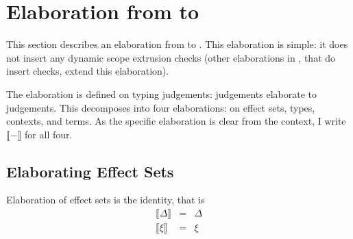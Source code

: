 \section{Elaboration from \texorpdfstring{\sourceLang{}}{Lambda-Op-Quote-Splice} to \texorpdfstring{\coreLang{}}{Lambda-Op-AST}}\label{section:elaboration}
This section describes an elaboration from \sourceLang{} to \coreLang{}. This elaboration is simple: it does not insert any dynamic scope extrusion checks (other elaborations in , that do insert checks, extend this elaboration).

\newcommand{\elaborate}[1]{\llbracket #1 \rrbracket}
\newcommand{\erase}[1]{\textsf{erase}(#1)}
\newcommand{\AST}[1]{\textsf{AST}(#1)}
\newcommand{\Code}[1]{\textsf{Code}(#1)}


The elaboration is defined on typing judgements: \sourceLang{} judgements elaborate to \coreLang{} judgements. This decomposes into four elaborations: on effect sets, types, contexts, and terms. As the specific elaboration is clear from the context, I write $\llbracket - \rrbracket$ for all four.

\subsection{Elaborating Effect Sets}
Elaboration of effect sets is the identity, that is 
\[\begin{array}{rcl}
  \elaborate{\Delta} &=& \Delta \\
  \elaborate{\xi}&=&{\xi}
\end{array}\]

